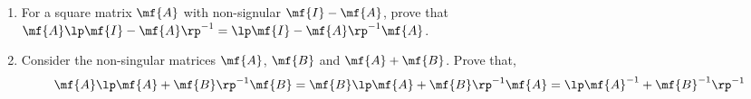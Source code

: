 \begin{enumerate}[resume]

    \item For a square matrix $\mf{A}$ with non-signular $\mf{I} - \mf{A}$, prove that $\mf{A}\lp\mf{I} - \mf{A}\rp^{-1} = \lp\mf{I} - \mf{A}\rp^{-1}\mf{A}$.

    \item Consider the non-singular matrices $\mf{A}$, $\mf{B}$ and $\mf{A} + \mf{B}$. Prove that,
    \[ \mf{A}\lp\mf{A} + \mf{B}\rp^{-1}\mf{B} = \mf{B}\lp\mf{A} + \mf{B}\rp^{-1}\mf{A} = \lp\mf{A}^{-1} + \mf{B}^{-1}\rp^{-1} \]

\end{enumerate}
